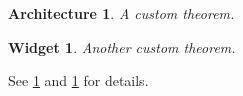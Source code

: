 \documentclass{article}
\newtheorem{arch}{Architecture}
\newtheorem{widget}{Widget}
\begin{document}
\begin{arch}\label{myarch}
A custom theorem.
\end{arch}
\begin{widget}\label{mywidget}
Another custom theorem.
\end{widget}
See \cref{myarch} and \cref{mywidget} for details.
\end{document}
